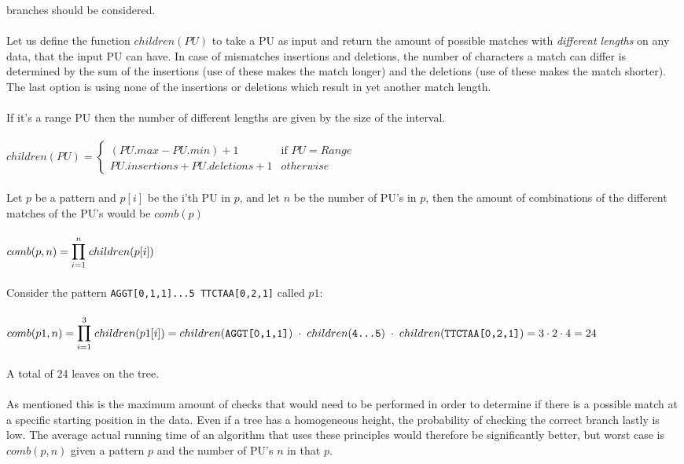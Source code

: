 \documentclass[12pt]{article}
\newcommand{\pu}{PU }
\newcommand{\pus}{PU's }
\begin{document}
branches should be considered. \\ \\
Let us define the function $children(\pu)$ to take a \pu as input and return the amount of possible matches with	
\textit{different lengths} on any data, that the input \pu can have.
In case of mismatches insertions and deletions, the number of characters a match can differ is determined by 
the sum of the insertions (use of these makes the match longer)
and the deletions (use of these makes the match shorter). The last option is using none of the insertions or deletions which
result in yet another match length. \\ \\
If it's a range \pu then the number of different lengths are given by the size of the interval. \\ \\
$children(PU)=
\left\{
\begin{array}{ll}
(PU.max - PU.min) + 1 & \mbox{if } PU=Range \\
PU.insertions+PU.deletions+1 & otherwise 
\end{array}
\right.$
 \\ \\
Let $p$ be a pattern and $p[i]$ be the i'th \pu in $p$, and let $n$ be the number of \pus in $p$,
then the amount of combinations of the different matches of the \pus would be $comb(p)$ \\ \\
$comb(p,n)=\mathlarger{\mathlarger{\prod}_{i=1}^{n}\;children(p[i])}$ \\ \\
Consider the pattern \texttt{AGGT[0,1,1]...5\; TTCTAA[0,2,1]} called $p1$: \\ \\
$comb(p1,n)=\mathlarger{\mathlarger{\prod}_{i=1}^{3}\;children(p1[i])}= \\ \\
children(\texttt{AGGT[0,1,1]})\;\cdot \;children(\texttt{4...5})\;\cdot \;children(\texttt{TTCTAA[0,2,1]})=
3\cdot 2\cdot 4=24$ \\ \\
A total of 24 leaves on the tree. \\ \\
As mentioned this is the maximum amount of checks that would need to be performed in order to determine if there is a 
possible match at a specific starting position in the data. Even if a tree has a homogeneous 
height, the probability of checking the correct branch lastly is low.
The average actual running time of an algorithm that uses these principles would therefore be significantly better, 
but worst case is
$comb(p,n)$ given a pattern $p$ and the number of \pus $n$ in that $p$.
\end{document}
